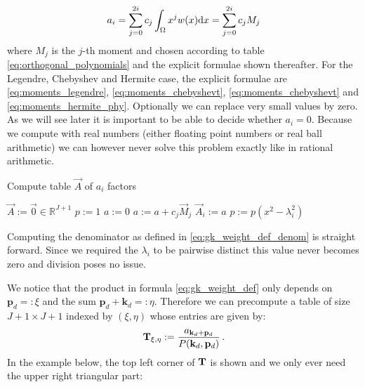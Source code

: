 \documentclass[a4paper,10pt]{article}
\begin{document}
\begin{equation}
  a_i = \sum_{j=0}^{2i} c_j \int_\Omega x^j w(x) \mathrm{d}x = \sum_{j=0}^{2i} c_j M_j
\end{equation}
where $M_j$ is the $j$-th moment and chosen according to table
\eqref{eq:orthogonal_polynomials} and the explicit formulae shown thereafter.
For the Legendre, Chebyshev and Hermite case, the explicit formulae are
\eqref{eq:moments_legendre}, \eqref{eq:moments_chebyshevt}, \eqref{eq:moments_chebyshevt}
and \eqref{eq:moments_hermite_phy}.
Optionally we can replace very small values by zero. As we will see later
it is important to be able to decide whether $a_{i} = 0$. Because we
compute with real numbers (either floating point numbers or real ball arithmetic)
we can however never solve this problem exactly like in rational arithmetic.

\begin{algorithm}[h!]
  \caption{Compute table $\vec{A}$ of $a_{i}$ factors}
  \label{alg:gk_compute_weight_factors}
  \begin{algorithmic}
      \State $\vec{A} := \vec{0} \in \mathbb{R}^{J+1}$
      \State $p := 1$
        \State $a := 0$
          \State $a := a + c_j \vec{M}_j$
        \EndFor
        \State $\vec{A}_i := a$
        \State $p := p \left(x^2 - \lambda_i^2\right)$
      \EndFor
    \EndProcedure
  \end{algorithmic}
\end{algorithm}

Computing the denominator as defined in \eqref{eq:gk_weight_def_denom}
is straight forward. Since we required the $\lambda_i$ to be pairwise
distinct this value never becomes zero and division poses no issue.

We notice that the product in formula \eqref{eq:gk_weight_def} only depends on
$\mathbf{p}_{d} =: \xi$ and the sum $\mathbf{p}_{d}+\mathbf{k}_{d} =: \eta$.
Therefore we can precompute a table of size $J+1 \times J+1$ indexed by $(\xi, \eta)$
whose entries are given by:
\begin{equation}
  \mathbf{T}_{\xi, \eta} := \frac{a_{\mathbf{k}_{d}+\mathbf{p}_{d}}}{P(\mathbf{k}_{d},\mathbf{p}_{d})} \,.
\end{equation}
In the example below, the top left corner of $\mathbf{T}$ is shown and we only
ever need the upper right triangular part:
\end{document}
